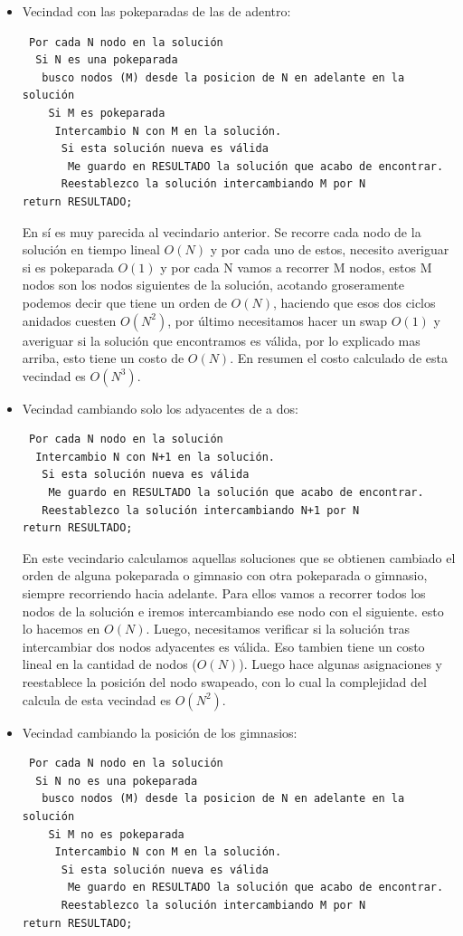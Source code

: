 \begin{itemize}
\item Vecindad con las pokeparadas de las de adentro:

\begin{verbatim}
 Por cada N nodo en la solución
  Si N es una pokeparada 
   busco nodos (M) desde la posicion de N en adelante en la solución
    Si M es pokeparada
     Intercambio N con M en la solución.
      Si esta solución nueva es válida
       Me guardo en RESULTADO la solución que acabo de encontrar.
      Reestablezco la solución intercambiando M por N  
return RESULTADO;
\end{verbatim}

En sí es muy parecida al vecindario anterior. Se recorre cada nodo de la solución en tiempo lineal $O(N)$ y por cada uno de estos, necesito averiguar si es pokeparada $O(1)$ y por cada N vamos a recorrer M nodos, estos M nodos son los nodos siguientes de la solución, acotando groseramente podemos decir que tiene un orden de $O(N)$, haciendo que esos dos ciclos anidados cuesten $O(N^2)$, por último necesitamos hacer un swap $O(1)$ y averiguar si la solución que encontramos es válida, por lo explicado mas arriba, esto tiene un costo de $O(N)$.
En resumen el costo calculado de esta vecindad es $ O(N^3)$.

\item Vecindad cambiando solo los adyacentes de a dos:
\begin{verbatim} 
 Por cada N nodo en la solución 
  Intercambio N con N+1 en la solución.
   Si esta solución nueva es válida
    Me guardo en RESULTADO la solución que acabo de encontrar.
   Reestablezco la solución intercambiando N+1 por N  
return RESULTADO;
\end{verbatim}

En este vecindario calculamos aquellas soluciones que se obtienen cambiado el orden de alguna pokeparada o gimnasio con otra pokeparada o gimnasio, siempre recorriendo hacia adelante.
Para ellos vamos a recorrer todos los nodos de la solución e iremos intercambiando ese nodo con el siguiente. esto lo hacemos en $O(N)$. Luego, necesitamos verificar si la solución tras intercambiar dos nodos adyacentes es válida. Eso tambien tiene un costo lineal en la cantidad de nodos ($O(N)$). Luego hace algunas asignaciones y reestablece la posición del nodo swapeado, con lo cual la complejidad del calcula de esta vecindad es $O(N^2)$.

\item Vecindad cambiando la posición de los gimnasios:
\begin{verbatim} 
 Por cada N nodo en la solución
  Si N no es una pokeparada 
   busco nodos (M) desde la posicion de N en adelante en la solución
    Si M no es pokeparada
     Intercambio N con M en la solución.
      Si esta solución nueva es válida
       Me guardo en RESULTADO la solución que acabo de encontrar.
      Reestablezco la solución intercambiando M por N  
return RESULTADO;
\end{verbatim}


\end{itemize}
